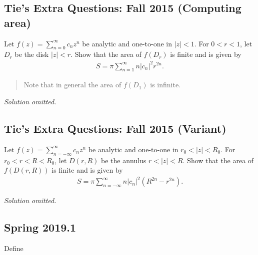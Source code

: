 \hypertarget{ties-extra-questions-fall-2015-computing-area}{%
\subsection{Tie's Extra Questions: Fall 2015 (Computing
area)}\label{ties-extra-questions-fall-2015-computing-area}}

\begin{problem}[?]

Let \(f(z) = \sum_{n=0}^\infty c_n z^n\) be analytic and one-to-one in
\(|z| < 1\). For \(0<r<1\), let \(D_r\) be the disk \(|z|<r\). Show that
the area of \(f(D_r)\) is finite and is given by
\begin{align*}
S = \pi \sum_{n=1}^\infty n |c_n|^2 r^{2n}
.\end{align*}

\begin{quote}
Note that in general the area of \(f(D_1)\) is infinite.
\end{quote}

\end{problem}

\emph{Solution omitted.}

\hypertarget{ties-extra-questions-fall-2015-variant}{%
\subsection{Tie's Extra Questions: Fall 2015
(Variant)}\label{ties-extra-questions-fall-2015-variant}}

\begin{problem}[?]

Let \(f(z) = \sum_{n= -\infty}^\infty c_n z^n\) be analytic and
one-to-one in \(r_0< |z| < R_0\). For \(r_0<r<R<R_0\), let \(D(r,R)\) be
the annulus \(r<|z|<R\). Show that the area of \(f(D(r,R))\) is finite
and is given by
\begin{align*}S = \pi \sum_{n=- \infty}^\infty n |c_n|^2 (R^{2n} - r^{2n}).\end{align*}

\end{problem}

\emph{Solution omitted.}

\hypertarget{spring-2019.1}{%
\subsection{Spring 2019.1}\label{spring-2019.1}}

Define


